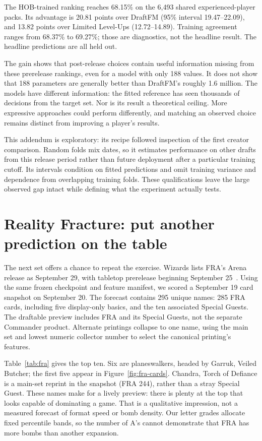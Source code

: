 \documentclass[11pt]{article}
\begin{document}
The HOB-trained ranking reaches 68.15\% on the 6,493 shared experienced-player
packs. Its advantage is 20.81 points over DraftFM (95\% interval
19.47--22.09), and 13.82 points over Limited Level-Ups (12.72--14.89).
Training agreement ranges from 68.37\% to 69.27\%; those are diagnostics,
not the headline result. The headline predictions are all held out.

The gain shows that post-release choices contain useful information missing
from these prerelease rankings, even for a model with only 188 values.
It does not show that 188 parameters are generally better than DraftFM's
roughly 1.6 million. The models have different information: the fitted
reference has seen thousands of decisions from the target set. Nor is its
result a theoretical ceiling. More expressive approaches could perform
differently, and matching an observed choice remains distinct from improving
a player's results.

This addendum is exploratory: its recipe followed inspection of the first
creator comparison. Random folds mix dates, so it estimates performance on
other drafts from this release period rather than future deployment after
a particular training cutoff. Its intervals condition on fitted predictions
and omit training variance and dependence from overlapping training folds.
These qualifications leave the large observed gap intact while defining
what the experiment actually tests.

\section{Reality Fracture: put another prediction on the table}

The next set offers a chance to repeat the exercise. Wizards lists FRA's
Arena release as September 29, with tabletop prerelease beginning September
25~\cite{fra}. Using the same frozen checkpoint and feature manifest, we
scored a September 19 card snapshot on September 20. The forecast
contains 295 unique names: 285 FRA cards, including five display-only basics,
and the ten associated Special Guests. The draftable preview includes FRA
and its Special Guests, not the separate Commander product. Alternate
printings collapse to one name, using the main set and lowest numeric
collector number to select the canonical printing's features.

Table~\ref{tab:fra} gives the top ten. Six are planeswalkers, headed by
Garruk, Veiled Butcher; the first five appear in
Figure~\ref{fig:fra-cards}. Chandra, Torch of Defiance is a main-set reprint in
the snapshot (FRA 244), rather than a stray Special Guest. These names make
for a lively preview: there is plenty at the top that looks capable of
dominating a game. That is a qualitative impression, not a measured forecast
of format speed or bomb density. Our letter grades allocate fixed percentile
bands, so the number of A's cannot demonstrate that FRA has more bombs than
another expansion.
\end{document}
